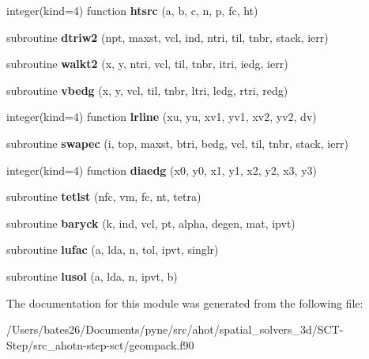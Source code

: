 \begin{DoxyCompactItemize}
\item 
\hypertarget{classgeompack_ac0a055d7534043b545b23cb09104b68e}{integer(kind=4) function {\bfseries htsrc} (a, b, c, n, p, fc, ht)}\label{classgeompack_ac0a055d7534043b545b23cb09104b68e}

\item 
\hypertarget{classgeompack_ac83af4943560085ee3f25b817aa45b9c}{subroutine {\bfseries dtriw2} (npt, maxst, vcl, ind, ntri, til, tnbr, stack, ierr)}\label{classgeompack_ac83af4943560085ee3f25b817aa45b9c}

\item 
\hypertarget{classgeompack_a25b0a5c22a744be77665e36e4a1062af}{subroutine {\bfseries walkt2} (x, y, ntri, vcl, til, tnbr, itri, iedg, ierr)}\label{classgeompack_a25b0a5c22a744be77665e36e4a1062af}

\item 
\hypertarget{classgeompack_a38c94eee465e80bf8838faf84fbecc0c}{subroutine {\bfseries vbedg} (x, y, vcl, til, tnbr, ltri, ledg, rtri, redg)}\label{classgeompack_a38c94eee465e80bf8838faf84fbecc0c}

\item 
\hypertarget{classgeompack_a9ad84c591ca6884ed9df315f68f3f30c}{integer(kind=4) function {\bfseries lrline} (xu, yu, xv1, yv1, xv2, yv2, dv)}\label{classgeompack_a9ad84c591ca6884ed9df315f68f3f30c}

\item 
\hypertarget{classgeompack_a55066c94f489f5a120f06c1f576e167f}{subroutine {\bfseries swapec} (i, top, maxst, btri, bedg, vcl, til, tnbr, stack, ierr)}\label{classgeompack_a55066c94f489f5a120f06c1f576e167f}

\item 
\hypertarget{classgeompack_aa309a784a534b06779c17338510e1d7e}{integer(kind=4) function {\bfseries diaedg} (x0, y0, x1, y1, x2, y2, x3, y3)}\label{classgeompack_aa309a784a534b06779c17338510e1d7e}

\item 
\hypertarget{classgeompack_a4ea8209ecfbd40ef48d79302d930352f}{subroutine {\bfseries tetlst} (nfc, vm, fc, nt, tetra)}\label{classgeompack_a4ea8209ecfbd40ef48d79302d930352f}

\item 
\hypertarget{classgeompack_ac332e0faf391cc194c70cfc300de1059}{subroutine {\bfseries baryck} (k, ind, vcl, pt, alpha, degen, mat, ipvt)}\label{classgeompack_ac332e0faf391cc194c70cfc300de1059}

\item 
\hypertarget{classgeompack_aa3c5e87b0e2e939bb490bb9591939213}{subroutine {\bfseries lufac} (a, lda, n, tol, ipvt, singlr)}\label{classgeompack_aa3c5e87b0e2e939bb490bb9591939213}

\item 
\hypertarget{classgeompack_a4b68a0623aa709973fa045f833408ce4}{subroutine {\bfseries lusol} (a, lda, n, ipvt, b)}\label{classgeompack_a4b68a0623aa709973fa045f833408ce4}

\end{DoxyCompactItemize}


The documentation for this module was generated from the following file\+:\begin{DoxyCompactItemize}
\item 
/\+Users/bates26/\+Documents/pyne/src/ahot/spatial\+\_\+solvers\+\_\+3d/\+S\+C\+T-\/\+Step/src\+\_\+ahotn-\/step-\/sct/geompack.\+f90\end{DoxyCompactItemize}
